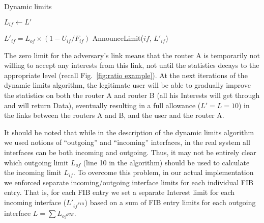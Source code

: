 \begin{algorithm}[h]
\caption{Dynamic limits}
\label{alg:dynamic limits}
\begin{algorithmic}[1]
\State{} 
\vspace{0.2cm}
  

\vspace{0.2cm}

\State{} 
    \State $L_{if} \leftarrow L'$
\EndFunction

\vspace{0.2cm}

 

        \State $L'_{if}= {L_{of}} \times (1 - U_{if}/F_{if})$
        \State AnnounceLimit($if$, $L'_{if}$)
   \EndFor

\EndFor
\EndFunction

\end{algorithmic}
\end{algorithm}

The zero limit for the adversary's link means that the router A is temporarily not willing to accept any interests from this link, not until the statistics decays to the appropriate level (recall Fig.~\ref{fig:ratio example}).
At the next iterations of the dynamic limits algorithm, the legitimate user will be able to gradually improve the statistics on both the router A and router B (all his Interests will get through and will return Data), eventually resulting in a full allowance ($L'=L=10$) in the links between the routers A and B, and the user and the router A.

It should be noted that while in the description of the dynamic limits algorithm we used notions of ``outgoing'' and ``incoming'' interfaces, in the real system all interfaces can be both incoming and outgoing.
Thus, it may not be entirely clear which outgoing limit $L_{of}$ (line 10 in the algorithm) should be used to calculate the incoming limit $L_{if}$.
To overcome this problem, in our actual implementation we enforced separate incoming/outgoing interface limits for each individual FIB entry.
That is, for each FIB entry we set a separate Interest limit for each incoming interface ($L'_{{if}^{FIB}}$) based on a sum of FIB entry limits for each outgoing interface $L=\sum{L_{{of}^{FIB}}}$.


